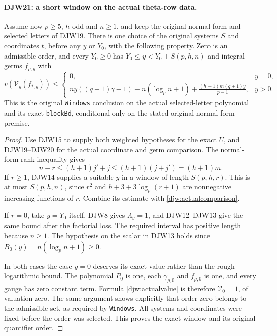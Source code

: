 \paragraph{DJW21: a short window on the actual theta-row data.}
\label{claim:DJW21}
Assume now $p\ge5$, $h$ odd and $n\ge1$, and keep the original
normal form and selected letters of DJW19.
There is one choice of the original systems $S$ and coordinates
$t$, before any $y$ or $Y_0$, with the following property.
Zero is an admissible order, and every $Y_0\ge0$ has
$Y_0\le y<Y_0+S(p,h,n)$ and integral germs $f_{\rho,y}$ with
\begin{equation}
 v(\mathcal V_y(f_{*,y}))\le
 \begin{cases}
 0,&y=0,\\[2pt]
 \displaystyle
 ny((q+1)\gamma-1)+n(\log_p n+1)
       +\frac{(h+1)m(q+1)y}{p-1},&y>0.
 \end{cases}
 \label{djw:actualwindow}
\end{equation}
This is the original \texttt{Windows} conclusion on the actual
selected-letter polynomial and its exact \texttt{blockBd},
conditional only on the stated original normal-form premise.

\begin{proof}
Use DJW15 to supply both weighted hypotheses for the exact $U$,
and DJW19--DJW20 for the actual coordinate and germ comparison.
The normal-form rank inequality gives
\[
 n-r\le(h+1)j'+j\le(h+1)(j+j')=(h+1)m.
\]
If $r\ge1$, DJW14 supplies a suitable $y$ in a window of length
$S(p,h,r)$.  This is at most $S(p,h,n)$, since $r^2$ and
$h+3+3\log_p(r+1)$ are nonnegative increasing functions of $r$.
Combine its estimate with \eqref{djw:actualcomparison}.

If $r=0$, take $y=Y_0$ itself.  DJW8 gives $\Lambda_y=1$,
and DJW12--DJW13 give the same bound after the factorial loss.
The required interval has positive length because $n\ge1$.
The hypothesis on the scalar in DJW13 holds since
$B_0(y)=n(\log_p n+1)\ge0$.

In both cases the case $y=0$ deserves its exact value rather than
the rough logarithmic bound.  The polynomial $P_0$ is one, each
$\gamma_{\rho,0}$ and $f_{\rho,0}$ is one, and every gauge
has zero constant term.  Formula \eqref{djw:actualvalue} is
therefore $\mathcal V_0=1$, of valuation zero.  The same argument
shows explicitly that order zero belongs to the admissible set,
as required by \texttt{Windows}.  All systems and coordinates
were fixed before the order was selected.  This proves the exact
window and its original quantifier order.
\end{proof}

